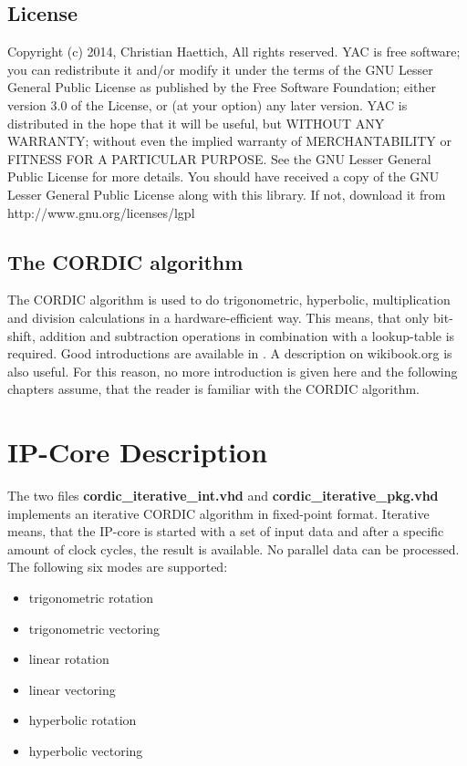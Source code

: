 \documentclass[a4paper, 12pt, notitlepage]{report}
\newcommand{\file}[1]{\textbf{#1}}
\begin{document}
\section{License}
Copyright (c) 2014, Christian Haettich, All rights reserved. \newline\newline 
YAC is free software; you can redistribute it and/or               
modify it under the terms of the GNU Lesser General Public         
License as published by the Free Software Foundation; either       
version 3.0 of the License, or (at your option) any later version. \newline\newline
YAC is distributed in the hope that it will be useful,             
but WITHOUT ANY WARRANTY; without even the implied warranty of     
MERCHANTABILITY or FITNESS FOR A PARTICULAR PURPOSE.  See the GNU  
Lesser General Public License for more details.              \newline\newline
You should have received a copy of the GNU Lesser General Public   
License along with this library. If not, download it from          
http://www.gnu.org/licenses/lgpl                                   
                                                                   

\section{The CORDIC algorithm}

The CORDIC algorithm is used to do trigonometric, hyperbolic, multiplication 
and division calculations in a hardware-efficient way. This means, that
only bit-shift, addition and subtraction operations in combination
with a lookup-table is required.\newline
Good introductions are available in \cite{survey}\cite{vlsi}\cite{dawid}.
A description on wikibook.org \cite{wikibook} is also useful.
For this reason, no more introduction is given here and the following chapters assume, that
the reader is familiar with the CORDIC algorithm.


\chapter{IP-Core Description}

The two files \file{cordic\_iterative\_int.vhd} and \file{cordic\_iterative\_pkg.vhd}
implements an iterative CORDIC algorithm in fixed-point format. 
Iterative means, that the IP-core is started with a set of input data and after
a specific amount of clock cycles, the result is available. No parallel data
can be processed. The 
following six modes are supported:
\begin{itemize}
   \item trigonometric rotation
   \item trigonometric vectoring
   \item linear rotation
   \item linear vectoring
   \item hyperbolic rotation
   \item hyperbolic vectoring
\end{itemize}
\end{document}
